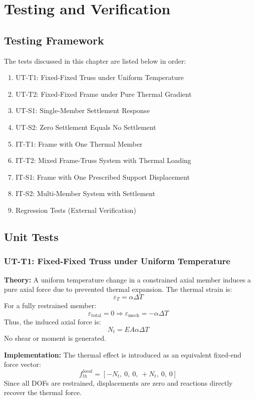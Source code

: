 \chapter{Testing and Verification}

\section{Testing Framework}

The tests discussed in this chapter are listed below in order:
\begin{enumerate}
    \item UT-T1: Fixed-Fixed Truss under Uniform Temperature
    \item UT-T2: Fixed-Fixed Frame under Pure Thermal Gradient
    \item UT-S1: Single-Member Settlement Response
    \item UT-S2: Zero Settlement Equals No Settlement
    \item IT-T1: Frame with One Thermal Member
    \item IT-T2: Mixed Frame-Truss System with Thermal Loading
    \item IT-S1: Frame with One Prescribed Support Displacement
    \item IT-S2: Multi-Member System with Settlement
    \item Regression Tests (External Verification)
\end{enumerate}

\section{Unit Tests}

\subsection{UT-T1: Fixed-Fixed Truss under Uniform Temperature}

\textbf{Theory:}  
A uniform temperature change in a constrained axial member induces a pure axial force due to prevented thermal expansion. The thermal strain is:
\[
\varepsilon_T = \alpha \Delta T
\]
For a fully restrained member:
\[
\varepsilon_{\text{total}} = 0 \Rightarrow \varepsilon_{\text{mech}} = -\alpha \Delta T
\]
Thus, the induced axial force is:
\[
N_t = EA\alpha \Delta T
\]
No shear or moment is generated.

\textbf{Implementation:}  
The thermal effect is introduced as an equivalent fixed-end force vector:
\[
f_{th}^{local} = [-N_t,\ 0,\ 0,\ +N_t,\ 0,\ 0]
\]
Since all DOFs are restrained, displacements are zero and reactions directly recover the thermal force.


